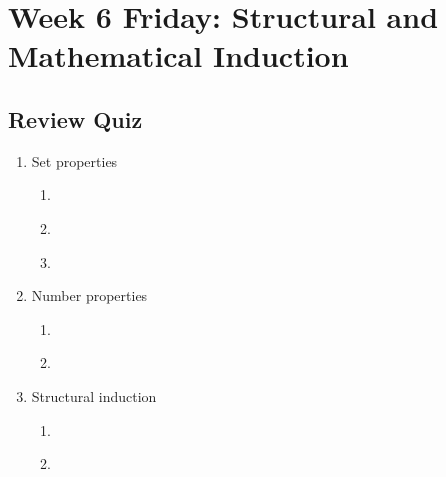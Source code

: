 \section*{Week 6 Friday: Structural and Mathematical Induction}


\newpage

\vfill

\newpage


\subsection*{Review Quiz}
\begin{enumerate}
\item Set properties
\begin{enumerate}
    \item \hspace{1in}\\ 
    \item \hspace{1in}\\ 
    \item \hspace{1in}\\ 
\end{enumerate}
\item Number properties\begin{enumerate}
    \item \hspace{1in}\\ 
    \item \hspace{1in}\\ 
\end{enumerate}
\item Structural induction
\begin{enumerate}
    \item 
    \item \hspace{1in}\\ 

\end{enumerate}
\end{enumerate}
